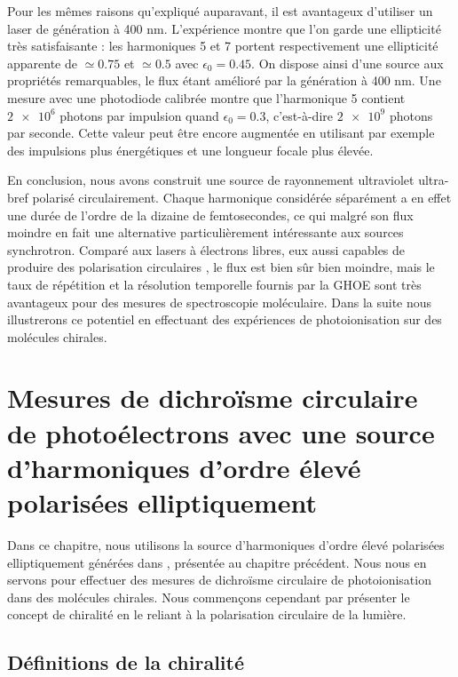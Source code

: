 Pour les mêmes raisons qu'expliqué auparavant, il est avantageux d'utiliser un laser de génération à 400 nm. L'expérience montre que l'on garde une ellipticité très satisfaisante : les harmoniques 5 et 7 portent respectivement une ellipticité apparente de $\simeq 0.75$ et $\simeq 0.5$ avec $\epsilon_0=0.45$. On dispose ainsi d'une source aux propriétés remarquables, le flux étant amélioré par la génération à 400 nm. Une mesure avec une photodiode calibrée montre que l'harmonique 5 contient $\num{2e6}$ photons par impulsion quand $\epsilon_0=0.3$, c'est-à-dire $\num{2e9}$ photons par seconde. Cette valeur peut être encore augmentée en utilisant par exemple des impulsions plus énergétiques et une longueur focale plus élevée.

En conclusion, nous avons construit une source de rayonnement ultraviolet ultra-bref polarisé circulairement. Chaque harmonique considérée séparément a en effet une durée de l'ordre de la dizaine de femtosecondes, ce qui malgré son flux moindre en fait une alternative particulièrement intéressante aux sources synchrotron. Comparé aux lasers à électrons libres, eux aussi capables de produire des polarisation circulaires , le flux est bien sûr bien moindre, mais le taux de répétition et la résolution temporelle fournis par la GHOE sont très avantageux pour des mesures de spectroscopie moléculaire. Dans la suite nous illustrerons ce potentiel en effectuant des expériences de photoionisation sur des molécules chirales. 
%
\chapter[Mesures de PECD avec une source d'harmoniques d'ordre élevé polarisées elliptiquement]{Mesures de dichroïsme circulaire de photoélectrons avec une source d'harmoniques d'ordre élevé polarisées elliptiquement}
\label{CH:PECD}
Dans ce chapitre, nous utilisons la source d'harmoniques d'ordre élevé polarisées elliptiquement générées dans , présentée au chapitre précédent. Nous nous en servons pour effectuer des mesures de dichroïsme circulaire de photoionisation dans des molécules chirales. Nous commençons cependant par présenter le concept de chiralité en le reliant à la polarisation circulaire de la lumière. 
 
\section{Définitions de la chiralité}
